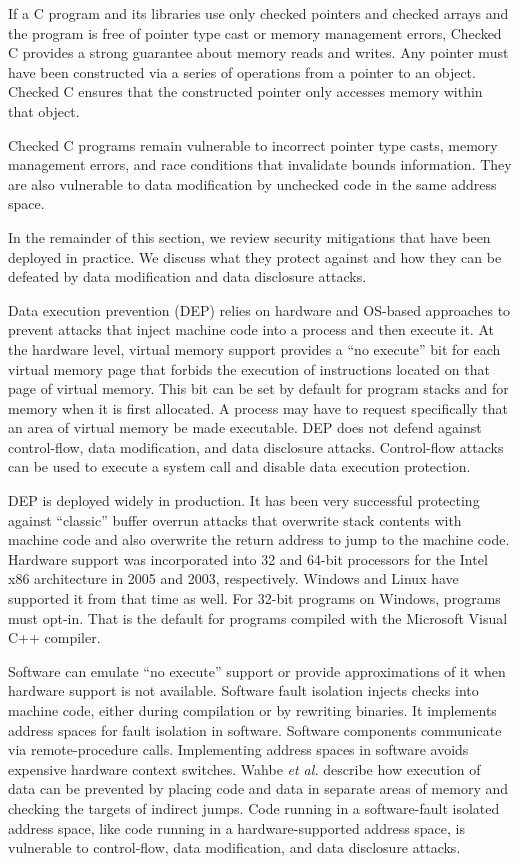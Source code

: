 If a C program and its libraries use only checked pointers and checked arrays and 
the program is free of pointer type 
cast or memory management errors, Checked C provides a strong
guarantee about memory reads and writes. Any pointer must have been constructed
via a  series of operations from a pointer to an object.   Checked C ensures 
that the constructed pointer only accesses memory within that object.

Checked C programs 
remain vulnerable  to incorrect pointer type casts, memory management errors, 
and race conditions that invalidate bounds information. They are also
vulnerable to data modification by unchecked code in the same address space.

In the remainder of this section, we review security mitigations that
have been deployed in practice. We discuss what they protect against
and how they can be defeated by data modification and data disclosure attacks.

Data execution prevention (DEP) relies on hardware and OS-based approaches
to prevent attacks that inject machine code into a process and then
execute it.   At the hardware level, virtual memory support provides
a ``no execute'' bit for each virtual memory page that forbids the execution
of instructions located on that page of virtual memory.  This bit can be set by
default for program stacks and for memory when it is first allocated. A process
may have to request specifically that an area of virtual memory be made
executable.  
DEP does not defend against control-flow,  data modification, and data disclosure
attacks.  Control-flow attacks can be used to execute a system call and disable 
data execution protection.    

DEP is deployed widely in production.  It has been very
successful protecting against ``classic'' buffer overrun attacks that overwrite 
stack contents with machine code and also overwrite the return address to jump to 
the machine code.
Hardware support was incorporated into 32 and 64-bit processors
for the Intel x86 architecture in 2005 and 2003, respectively.  Windows
and Linux have supported it from that time as well.  For 32-bit programs on
Windows, programs must opt-in.  That is the default for programs compiled
with the Microsoft Visual C++ compiler.

Software can emulate ``no execute'' support or provide approximations of it
when hardware support is not available. Software fault isolation
\cite{Castro2009, Erlingsson2006,McCamant2006,Wahbe1993,Yee2009} injects checks
into machine code, either during compilation or by rewriting binaries.
It implements address spaces for fault isolation in software. Software components communicate via remote-procedure calls. Implementing address
spaces in software avoids expensive hardware context switches.
Wahbe {\it et al.} \cite{Wahbe1993} describe how execution of data can be
prevented by placing code and data in separate areas of memory and checking the
targets of  indirect jumps.  Code running in a software-fault isolated address
space, like code running in a hardware-supported address space, is vulnerable to 
control-flow, data modification,  and data disclosure attacks.

